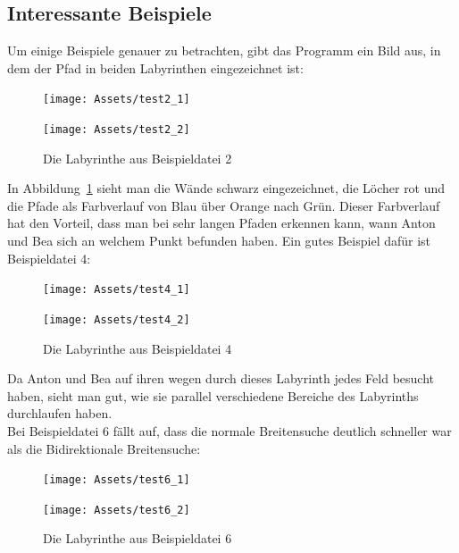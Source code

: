 \documentclass[a4paper,10pt,ngerman]{scrartcl}
\begin{document}
    \subsection{Interessante Beispiele}
    Um einige Beispiele genauer zu betrachten, gibt das Programm ein Bild aus, in dem der Pfad in beiden Labyrinthen eingezeichnet ist:
    \begin{figure} [H]
        \label{fig:2}
        \centering
        \begin{minipage}{.5\textwidth}
            \centering
            \texttt{[image: Assets/test2\_1]}
        \end{minipage}%
        \begin{minipage}{.5\textwidth}
            \centering
            \texttt{[image: Assets/test2\_2]}
        \end{minipage}
        \caption{Die Labyrinthe aus Beispieldatei 2}
    \end{figure}
    In Abbildung~\ref{fig:2} sieht man die Wände schwarz eingezeichnet, die Löcher rot und die Pfade als Farbverlauf von Blau über Orange nach Grün.
    Dieser Farbverlauf hat den Vorteil, dass man bei sehr langen Pfaden erkennen kann, wann Anton und Bea sich an welchem Punkt befunden haben.
    Ein gutes Beispiel dafür ist Beispieldatei 4:
    \begin{figure} [H]
        \label{fig:4}
        \centering
        \begin{minipage}{.5\textwidth}
            \centering
            \texttt{[image: Assets/test4\_1]}
        \end{minipage}%
        \begin{minipage}{.5\textwidth}
            \centering
            \texttt{[image: Assets/test4\_2]}
        \end{minipage}
        \caption{Die Labyrinthe aus Beispieldatei 4}
    \end{figure}
    Da Anton und Bea auf ihren wegen durch dieses Labyrinth jedes Feld besucht haben, sieht man gut, wie sie parallel verschiedene Bereiche des Labyrinths durchlaufen haben. \\
    Bei Beispieldatei 6 fällt auf, dass die normale Breitensuche deutlich schneller war als die Bidirektionale Breitensuche:
    \begin{figure} [H]
        \label{fig:6}
        \centering
        \begin{minipage}{.5\textwidth}
            \centering
            \texttt{[image: Assets/test6\_1]}
        \end{minipage}%
        \begin{minipage}{.5\textwidth}
            \centering
            \texttt{[image: Assets/test6\_2]}
        \end{minipage}
        \caption{Die Labyrinthe aus Beispieldatei 6}
    \end{figure}
\end{document}
